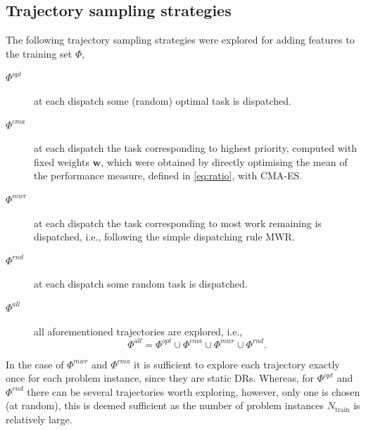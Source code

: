 \documentclass[smallextended]{llncs}
\renewcommand{\vec}[1]{\mathbf{#1}}
\begin{document}

\subsection{Trajectory sampling strategies}\label{sec:tracks}
The following trajectory sampling strategies were explored for adding features to the training set $\Phi$,
\begin{description}
\item[$\Phi^{opt}$] at each dispatch some (random) optimal task is dispatched.
\item[$\Phi^{cma}$] at each dispatch the task corresponding to highest priority, computed with fixed weights $\vec{w}$, which were obtained by directly optimising the mean of the performance measure, defined in \cref{eq:ratio}, with CMA-ES. 
\item[$\Phi^{mwr}$] at each dispatch the task corresponding to most work remaining is dispatched, i.e., following the simple dispatching rule MWR.
\item[$\Phi^{rnd}$] at each dispatch some random task is dispatched.
\item[$\Phi^{all}$] all aforementioned trajectories are explored, i.e., $$\Phi^{all}=\Phi^{opt}\cup \Phi^{cma}\cup \Phi^{mwr} \cup \Phi^{rnd}.$$
\end{description}
In the case of $\Phi^{mwr}$ and $\Phi^{cma}$ it is sufficient to explore each trajectory exactly once for each problem instance, since they are static DRs. Whereas, for $\Phi^{opt}$ and $\Phi^{rnd}$ there can be several trajectories worth exploring, however, only one is chosen (at random), this is deemed sufficient as the number of problem instances $N_{\text{train}}$ is relatively large.
\end{document}
